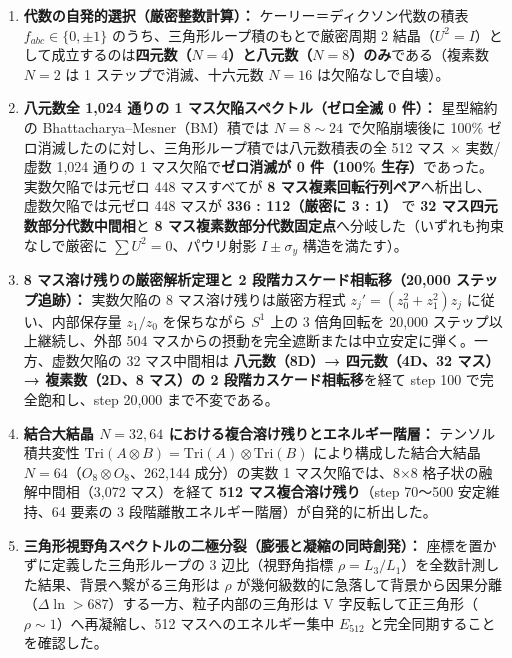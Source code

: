 \documentclass[
  a4paper,
]{ltjsarticle}
\providecommand{\tightlist}{%
  \setlength{\itemsep}{0pt}\setlength{\parskip}{0pt}}
\begin{document}
\begin{enumerate}
\def\labelenumi{\arabic{enumi}.}
\tightlist
\item
  \textbf{代数の自発的選択（厳密整数計算）：}
  ケーリー＝ディクソン代数の積表 \(f_{abc} \in \{0, \pm 1\}\)
  のうち、三角形ループ積のもとで厳密周期 2
  結晶（\(U^2 = I\)）として成立するのは\textbf{四元数（\(N=4\)）と八元数（\(N=8\)）のみ}である（複素数
  \(N=2\) は 1 ステップで消滅、十六元数 \(N=16\) は欠陥なしで自壊）。
\item
  \textbf{八元数全 1,024 通りの 1 マス欠陥スペクトル（ゼロ全滅 0 件）：}
  星型縮約の Bhattacharya--Mesner（BM）積では \(N = 8 \sim 24\)
  で欠陥崩壊後に 100\%
  ゼロ消滅したのに対し、三角形ループ積では八元数積表の全 512 マス ×
  実数/虚数 1,024 通りの 1 マス欠陥で\textbf{ゼロ消滅が 0 件（100\%
  生存）}であった。実数欠陥では元ゼロ 448 マスすべてが \textbf{8
  マス複素回転行列ペア}へ析出し、虚数欠陥では元ゼロ 448 マスが
  \textbf{336 : 112（厳密に 3 : 1）} で \textbf{32
  マス四元数部分代数中間相}と \textbf{8
  マス複素数部分代数固定点}へ分岐した（いずれも拘束なしで厳密に
  \(\sum U^2 = 0\)、パウリ射影 \(I \pm \sigma_y\) 構造を満たす）。
\item
  \textbf{8 マス溶け残りの厳密解析定理と 2 段階カスケード相転移（20,000
  ステップ追跡）：} 実数欠陥の 8 マス溶け残りは厳密方程式
  \(z_j' = (z_0^2 + z_1^2) z_j\) に従い、内部保存量 \(z_1/z_0\)
  を保ちながら \(S^1\) 上の 3 倍角回転を 20,000 ステップ以上継続し、外部
  504 マスからの摂動を完全遮断または中立安定に弾く。一方、虚数欠陥の 32
  マス中間相は \textbf{八元数（8D）→ 四元数（4D、32 マス）→
  複素数（2D、8 マス）の 2 段階カスケード相転移}を経て step 100
  で完全飽和し、step 20,000 まで不変である。
\item
  \textbf{結合大結晶 \(N = 32, 64\)
  における複合溶け残りとエネルギー階層：} テンソル積共変性
  \(\mathrm{Tri}(A \otimes B) = \mathrm{Tri}(A) \otimes \mathrm{Tri}(B)\)
  により構成した結合大結晶 \(N = 64\)（\(O_8 \otimes O_8\)、262,144
  成分）の実数 1 マス欠陥では、8×8 格子状の融解中間相（3,072
  マス）を経て \textbf{512 マス複合溶け残り}（step 70〜500 安定維持、64
  要素の 3 段階離散エネルギー階層）が自発的に析出した。
\item
  \textbf{三角形視野角スペクトルの二極分裂（膨張と凝縮の同時創発）：}
  座標を置かずに定義した三角形ループの 3 辺比（視野角指標
  \(\rho = L_3 / L_1\)）を全数計測した結果、背景へ繋がる三角形は
  \(\rho\)
  が幾何級数的に急落して背景から因果分離（\(\Delta\ln > 687\)）する一方、粒子内部の三角形は
  V 字反転して正三角形（\(\rho \sim 1\)）へ再凝縮し、512
  マスへのエネルギー集中 \(E_{512}\) と完全同期することを確認した。
\end{enumerate}
\end{document}
